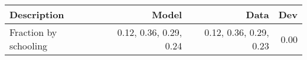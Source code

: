 \begin{tabular}{lrrr}
\hline
Description & Model  & Data  & Dev  \\ 
\hline
Fraction by schooling & 0.12, 0.36, 0.29, 0.24  & 0.12, 0.36, 0.29, 0.23  & 0.00  \\ 
\hline
\end{tabular}%
